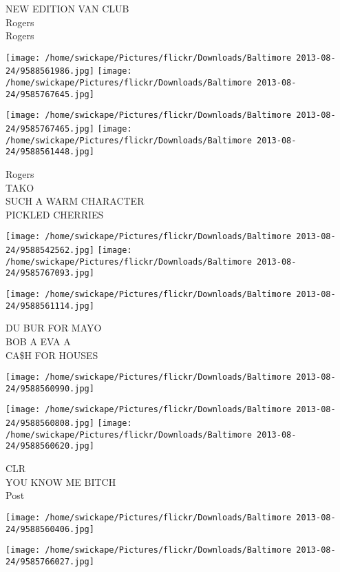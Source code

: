 \documentclass[10pt,letterpaper]{article}
\begin{document}
NEW EDITION VAN CLUB\\
Rogers\\
Rogers\\
\pagebreak

\texttt{[image: /home/swickape/Pictures/flickr/Downloads/Baltimore 2013-08-24/9588561986.jpg]}
\texttt{[image: /home/swickape/Pictures/flickr/Downloads/Baltimore 2013-08-24/9585767645.jpg]}

\texttt{[image: /home/swickape/Pictures/flickr/Downloads/Baltimore 2013-08-24/9585767465.jpg]}
\texttt{[image: /home/swickape/Pictures/flickr/Downloads/Baltimore 2013-08-24/9588561448.jpg]}

Rogers\\
TAKO\\
SUCH A WARM CHARACTER\\
PICKLED CHERRIES\\
\pagebreak

\texttt{[image: /home/swickape/Pictures/flickr/Downloads/Baltimore 2013-08-24/9588542562.jpg]}
\texttt{[image: /home/swickape/Pictures/flickr/Downloads/Baltimore 2013-08-24/9585767093.jpg]}

\texttt{[image: /home/swickape/Pictures/flickr/Downloads/Baltimore 2013-08-24/9588561114.jpg]}

DU BUR FOR MAYO\\
BOB A EVA A\\
CA\$H FOR HOUSES\\
\pagebreak

\texttt{[image: /home/swickape/Pictures/flickr/Downloads/Baltimore 2013-08-24/9588560990.jpg]}

\vspace{0.25in}
\texttt{[image: /home/swickape/Pictures/flickr/Downloads/Baltimore 2013-08-24/9588560808.jpg]}
\texttt{[image: /home/swickape/Pictures/flickr/Downloads/Baltimore 2013-08-24/9588560620.jpg]}

CLR\\
YOU KNOW ME BITCH\\
Post\\
\pagebreak

\texttt{[image: /home/swickape/Pictures/flickr/Downloads/Baltimore 2013-08-24/9588560406.jpg]}

\vspace{0.25in}
\texttt{[image: /home/swickape/Pictures/flickr/Downloads/Baltimore 2013-08-24/9585766027.jpg]}
\end{document}
